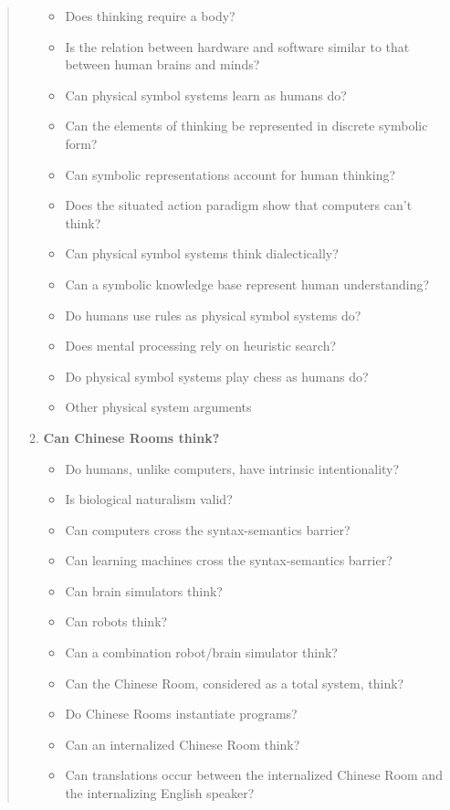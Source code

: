 \begin{quotation}
\begin{enumerate}
      \begin{itemize}
        \item Does thinking require a body?
        \item Is the relation between hardware and software similar to that between human brains and minds?
        \item Can physical symbol systems learn as humans do?
        \item Can the elements of thinking be represented in discrete symbolic form?
        \item Can symbolic representations account for human thinking?
        \item Does the situated action paradigm show that computers can't think?
        \item Can physical symbol systems think dialectically?
        \item Can a symbolic knowledge base represent human understanding?
        \item Do humans use rules as physical symbol systems do?
        \item Does mental processing rely on heuristic search?
        \item Do physical symbol systems play chess as humans do?
        \item Other physical system arguments
      \end{itemize}
    \item \textbf{Can Chinese Rooms think?}
      \begin{itemize}
        \item Do humans, unlike computers, have intrinsic intentionality?
        \item Is biological naturalism valid?
        \item Can computers cross the syntax-semantics barrier?
        \item Can learning machines cross the syntax-semantics barrier?
        \item Can brain simulators think?
        \item Can robots think?
        \item Can a combination robot/brain simulator think?
        \item Can the Chinese Room, considered as a total system, think?
        \item Do Chinese Rooms instantiate programs?
        \item Can an internalized Chinese Room think?
        \item Can translations occur between the internalized Chinese Room and the internalizing English speaker?

\end{itemize}
\end{enumerate}
\end{quotation}
